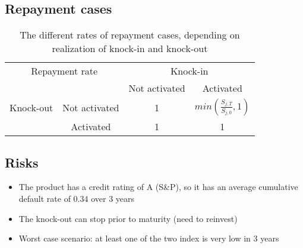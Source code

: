 \subsection{Repayment cases}
\begin{frame}
\myframetitle{}
\begin{table}[c]
	\centering
	\begin{tabular}{|c|c|c|c|} 
    \hline
    \multicolumn{2}{|c|}{Repayment rate} & \multicolumn{2}{c|}{Knock-in} 										 \\
		\cline{3-4}
    \multicolumn{2}{|c|}{}  						 & Not activated 	& Activated 											 \\
    \hline
		Knock-out & Not activated 					 & 1 							& $min(\frac{S_{j,T}}{S_{j,0}},1)$ \\
		\cline{2-4}
							& Activated 							 & 1 							&	1 															 \\
    \hline
	\end{tabular}
	\caption{The different rates of repayment cases, depending on realization of knock-in and knock-out}
\end{table}

\end{frame}

\subsection{Risks}
\begin{frame}
\myframetitle{}
\begin{itemize}
	\item The product has a credit rating of A (S\&P), so it has an average cumulative default rate of 0.34 over 3 years
	\item The knock-out can stop prior to maturity (need to reinvest)
	\item Worst case scenario: at least one of the two index is very low in 3 years
\end{itemize}
\end{frame}

